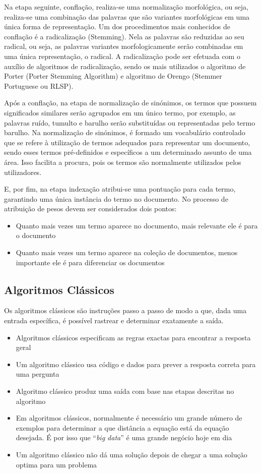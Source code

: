 \documentclass[a4paper,10pt]{article}
\begin{document}
Na etapa seguinte, conflação, realiza-se uma normalização morfológica, ou seja, realiza-se uma combinação das palavras que são variantes morfológicas em uma única forma de representação.
Um dos procedimentos mais conhecidos de conflação é a radicalização (Stemming).
Nela as palavras são reduzidas ao seu radical, ou seja, as palavras variantes morfologicamente serão combinadas em uma única representação, o radical.
A radicalização pode ser efetuada com o auxílio de algoritmos de radicalização, sendo os mais utilizados o algoritmo de Porter (Porter Stemming Algorithm) e algoritmo de Orengo (Stemmer Portuguese ou RLSP).

Após a conflação, na etapa de normalização de sinónimos, os termos que possuem significados similares serão agrupados em um único termo, por exemplo, as palavras ruído, tumulto e barulho serão substituídas ou representadas pelo termo barulho.
Na normalização de sinónimos, é formado um vocabulário controlado que se refere à utilização de termos adequados para representar um documento, sendo esses termos pré-definidos e específicos a um determinado assunto de uma área.
Isso facilita a procura, pois os termos são normalmente utilizados pelos utilizadores.

E, por fim, na etapa indexação atribui-se uma pontuação para cada termo, garantindo uma única instância do termo no documento.
No processo de atribuição de pesos devem ser considerados dois pontos:
\begin{itemize}
    \item Quanto mais vezes um termo aparece no documento, mais relevante ele é para o documento
    \item Quanto mais vezes um termo aparece na coleção de documentos, menos importante ele é para diferenciar os documentos
\end{itemize}

\subsection{Algoritmos Clássicos}

Os algoritmos clássicos são instruções passo a passo de modo a que, dada uma entrada específica, é possível rastrear e determinar exatamente a saída.
\begin{itemize}
    \item Algoritmos clássicos especificam as regras exactas para encontrar a resposta geral
    \item Um algoritmo clássico usa código e dados para prever a resposta correta para uma pergunta
    \item Algoritmo clássico produz uma saída com base nas etapas descritas no algoritmo
    \item Em algoritmos clássicos, normalmente é necessário um grande número de exemplos para determinar a que distância a equação está da equação desejada. É por isso que ``\textit{big data}'' é uma grande negócio hoje em dia
    \item Um algoritmo clássico não dá uma solução depois de chegar a uma solução optima para um problema
\end{itemize}
\end{document}
